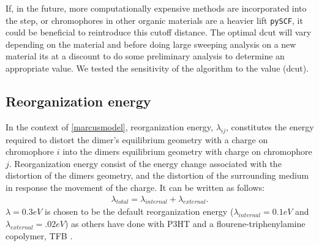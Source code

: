 If, in the future, more computationally expensive methods are incorporated into the  step, or chromophores in other
organic materials are a heavier lift \texttt{pySCF}, it could be beneficial to reintroduce this cutoff distance. The optimal dcut will vary depending on the material and before doing large sweeping analysis on a new
material its at a discount to do some preliminary analysis to determine an appropriate value. We tested the
sensitivity of the algorithm to the value (dcut). 

\subsection{Reorganization energy}

In the context of \autoref{marcusmodel}, 
reorganization energy, $\lambda_{ij}$, constitutes the energy required to distort the dimer's equilibrium geometry with a
charge on chromophore $i$ into the dimers equilibrium geometry with charge on chromophore $j$.
Reorganization energy consist of the energy change associated with the distortion of the dimers geometry,
and the distortion of the surrounding medium in response the movement of the charge. It can be written as
follows:
\begin{align}
    \lambda_{total} = \lambda_{internal} + \lambda_{external}.
\end{align} 
$\lambda = 0.3eV$ is chosen to be the default reorganization energy ($\lambda_{internal} = 0.1eV$
and $\lambda_{external} = .02eV$) as others have done with P3HT \cite{jones2017} and
a flourene-triphenylamine copolymer, TFB \cite{Gali2017}. 

